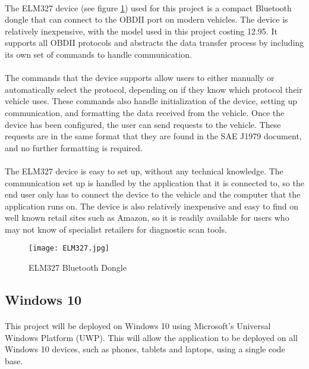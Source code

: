 		\paragraph{}{
		The ELM327 device (see figure \ref{fig:ELM327}) used for this project is a compact Bluetooth dongle that can connect to the OBDII port on modern vehicles. The device is relatively inexpensive, with the model used in this project costing {\textsterling}12.95. It supports all OBDII protocols and abstracts the data transfer process by including its own set of commands to handle communication.				
		}
		\paragraph{}{
		The commands that the device supports allow users to either manually or automatically select the protocol, depending on if they know which protocol their vehicle uses. These commands also handle initialization of the device, setting up communication, and formatting the data received from the vehicle. Once the device has been configured, the user can send requests to the vehicle. These requests are in the same format that they are found in the SAE J1979 document, and no further formatting is required.
		}
		\paragraph{}{
		The ELM327 device is easy to set up, without any technical knowledge. The communication set up is handled by the application that it is connected to, so the end user only has to connect the device to the vehicle and the computer that the application runs on. The device is also relatively inexpensive and easy to find on well known retail sites such as Amazon, so it is readily available for users who may not know of specialist retailers for diagnostic scan tools.
		}
		\begin{figure}[h]
				\begin{center}											
					\texttt{[image: ELM327.jpg]}
					\caption{ELM327 Bluetooth Dongle}
					\label{fig:ELM327}
				\end{center}
		\end{figure}		
\newpage
	\subsection{Windows 10}
		\paragraph{}{
		This project will be deployed on Windows 10 using Microsoft's Universal Windows Platform (UWP). This will allow the application to be deployed on all Windows 10 devices, such as phones, tablets and laptops, using a single code base.
		}
